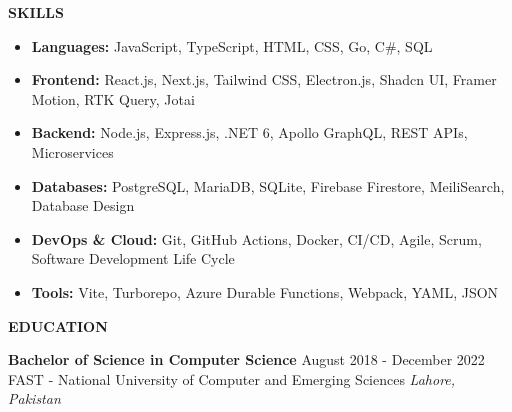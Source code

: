 \documentclass{resume} %
\newcommand{\largeSection}[1]{\textbf{\Large #1}}
\begin{document}
\begin{rSection}{\largeSection{SKILLS}}

\begin{itemize}
    \itemsep -3pt {}
    \item \textbf{Languages:} JavaScript, TypeScript, HTML, CSS, Go, C\#, SQL
    \item \textbf{Frontend:} React.js, Next.js, Tailwind CSS, Electron.js, Shadcn UI, Framer Motion, RTK Query, Jotai
    \item \textbf{Backend:} Node.js, Express.js, .NET 6, Apollo GraphQL, REST APIs, Microservices
    \item \textbf{Databases:} PostgreSQL, MariaDB, SQLite, Firebase Firestore, MeiliSearch, Database Design
    \item \textbf{DevOps \& Cloud:} Git, GitHub Actions, Docker, CI/CD, Agile, Scrum, Software Development Life Cycle
    \item \textbf{Tools:} Vite, Turborepo, Azure Durable Functions, Webpack, YAML, JSON
\end{itemize}

\end{rSection}


\begin{rSection}{\largeSection{EDUCATION}}

\textbf{Bachelor of Science in Computer Science} \hfill August 2018 - December 2022\\
FAST - National University of Computer and Emerging Sciences \hfill \textit{Lahore, Pakistan}

\end{rSection}
\end{document}
